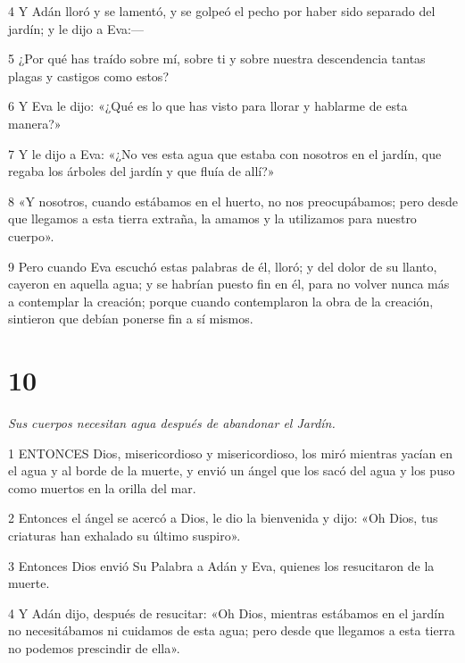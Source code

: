 \par 4 Y Adán lloró y se lamentó, y se golpeó el pecho por haber sido separado del jardín; y le dijo a Eva:—

\par 5 ¿Por qué has traído sobre mí, sobre ti y sobre nuestra descendencia tantas plagas y castigos como estos?

\par 6 Y Eva le dijo: «¿Qué es lo que has visto para llorar y hablarme de esta manera?»

\par 7 Y le dijo a Eva: «¿No ves esta agua que estaba con nosotros en el jardín, que regaba los árboles del jardín y que fluía de allí?»

\par 8 «Y nosotros, cuando estábamos en el huerto, no nos preocupábamos; pero desde que llegamos a esta tierra extraña, la amamos y la utilizamos para nuestro cuerpo».

\par 9 Pero cuando Eva escuchó estas palabras de él, lloró; y del dolor de su llanto, cayeron en aquella agua; y se habrían puesto fin en él, para no volver nunca más a contemplar la creación; porque cuando contemplaron la obra de la creación, sintieron que debían ponerse fin a sí mismos.

\chapter{10}

\par \textit{Sus cuerpos necesitan agua después de abandonar el Jardín.}

\par 1 ENTONCES Dios, misericordioso y misericordioso, los miró mientras yacían en el agua y al borde de la muerte, y envió un ángel que los sacó del agua y los puso como muertos en la orilla del mar.

\par 2 Entonces el ángel se acercó a Dios, le dio la bienvenida y dijo: «Oh Dios, tus criaturas han exhalado su último suspiro».

\par 3 Entonces Dios envió Su Palabra a Adán y Eva, quienes los resucitaron de la muerte.

\par 4 Y Adán dijo, después de resucitar: «Oh Dios, mientras estábamos en el jardín no necesitábamos ni cuidamos de esta agua; pero desde que llegamos a esta tierra no podemos prescindir de ella».

